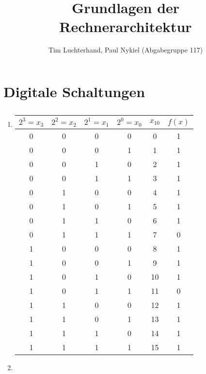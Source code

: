 \documentclass[DIN, pagenumber=false, fontsize=11pt, parskip=half]{scrartcl}
\title{Grundlagen der Rechnerarchitektur}
\author{Tim Luchterhand, Paul Nykiel (Abgabegruppe 117)}
\begin{document}
    \maketitle
    \section{Digitale Schaltungen}
    \subsection{}
    \begin{enumerate}[label = (\alph*)]
        \item 
            \begin{table}[H]
                \centering
                \begin{tabular}{cccc|c|c}
                    \toprule
                    $2^3 = x_3$ & $2^2 = x_2$ & $2^1 = x_1$ & $2^0 = x_0$ & $x_{10}$ & $f(x)$ \\
                    \midrule
                    0 & 0 & 0 & 0 & 0 & 1\\
                    0 & 0 & 0 & 1 & 1 & 1\\
                    0 & 0 & 1 & 0 & 2 & 1\\
                    0 & 0 & 1 & 1 & 3 & 1\\
                    0 & 1 & 0 & 0 & 4 & 1\\
                    0 & 1 & 0 & 1 & 5 & 1\\
                    0 & 1 & 1 & 0 & 6 & 1\\
                    0 & 1 & 1 & 1 & 7 & 0\\
                    1 & 0 & 0 & 0 & 8 & 1\\
                    1 & 0 & 0 & 1 & 9 & 1\\
                    1 & 0 & 1 & 0 & 10 & 1\\
                    1 & 0 & 1 & 1 & 11 & 0\\
                    1 & 1 & 0 & 0 & 12 & 1\\
                    1 & 1 & 0 & 1 & 13 & 1\\
                    1 & 1 & 1 & 0 & 14 & 1\\
                    1 & 1 & 1 & 1 & 15 & 1\\
                    \bottomrule
                \end{tabular}
            \end{table}
        \item

\end{enumerate}
\end{document}

